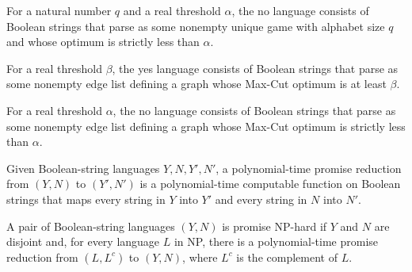 \begin{definition}
\label{BooleanAnalysis.GaussianSpace.UniqueGames.uniqueGameNo}
\leanok
{}
For a natural number $q$ and a real threshold $\alpha$, the no language consists of
Boolean strings that parse as some nonempty unique game with alphabet size $q$ and whose
optimum is strictly less than $\alpha$.
\end{definition}

\begin{definition}
\label{BooleanAnalysis.GaussianSpace.UniqueGames.maxCutYes}
\leanok
{}
For a real threshold $\beta$, the yes language consists of Boolean strings that parse as
some nonempty edge list defining a graph whose Max-Cut optimum is at least $\beta$.
\end{definition}

\begin{definition}
\label{BooleanAnalysis.GaussianSpace.UniqueGames.maxCutNo}
\leanok
{}
For a real threshold $\alpha$, the no language consists of Boolean strings that parse as
some nonempty edge list defining a graph whose Max-Cut optimum is strictly less than
$\alpha$.
\end{definition}

\begin{definition}
\label{BooleanAnalysis.GaussianSpace.UniqueGames.PolyTimePromiseReducible}
\leanok
{}
Given Boolean-string languages $Y,N,Y',N'$, a polynomial-time promise reduction from
$(Y,N)$ to $(Y',N')$ is a polynomial-time computable function on Boolean strings that
maps every string in $Y$ into $Y'$ and every string in $N$ into $N'$.
\end{definition}

\begin{definition}
\label{BooleanAnalysis.GaussianSpace.UniqueGames.PromiseNPHard}
\leanok
{}
A pair of Boolean-string languages $(Y,N)$ is promise NP-hard if $Y$ and $N$ are
disjoint and, for every language $L$ in NP, there is a polynomial-time promise reduction
from $(L,L^c)$ to $(Y,N)$, where $L^c$ is the complement of $L$.
\end{definition}

